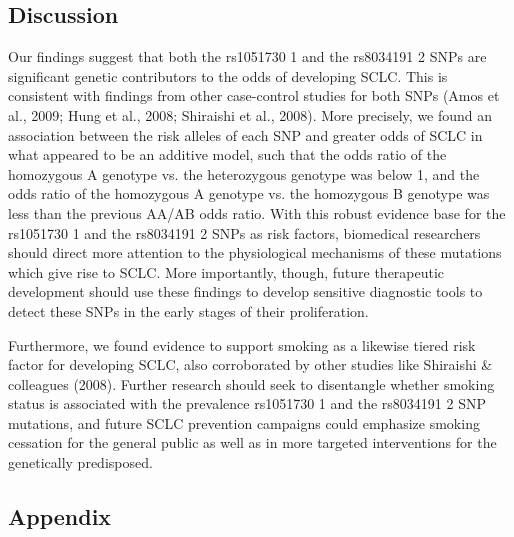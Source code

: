 \documentclass{article}
\begin{document}
	\subsection*{Discussion}
	Our findings suggest that both the rs1051730 1 and the rs8034191 2 SNPs are significant genetic contributors to the odds of developing SCLC. This is consistent with findings from other case-control studies for both SNPs (Amos et al., 2009; Hung et al., 2008; Shiraishi et al., 2008). More precisely, we found an association between the risk alleles of each SNP and greater odds of SCLC in what appeared to be an additive model, such that the odds ratio of the homozygous A genotype vs. the heterozygous genotype was below 1, and the odds ratio of the homozygous A genotype vs. the homozygous B genotype was less than the previous AA/AB odds ratio. With this robust evidence base for the rs1051730 1 and the rs8034191 2 SNPs as risk factors, biomedical researchers should direct more attention to the physiological mechanisms of these mutations which give rise to SCLC. More importantly, though, future therapeutic development should use these findings to develop sensitive diagnostic tools to detect these SNPs in the early stages of their proliferation. 
	
	Furthermore, we found evidence to support smoking as a likewise tiered risk factor for developing SCLC, also corroborated by other studies like Shiraishi \& colleagues (2008). Further research should seek to disentangle whether smoking status is associated with the prevalence rs1051730 1 and the rs8034191 2 SNP mutations, and future SCLC prevention campaigns could emphasize smoking cessation for the general public as well as in more targeted interventions for the genetically predisposed.

	\newpage
	
	\subsection*{Appendix}
\end{document}

